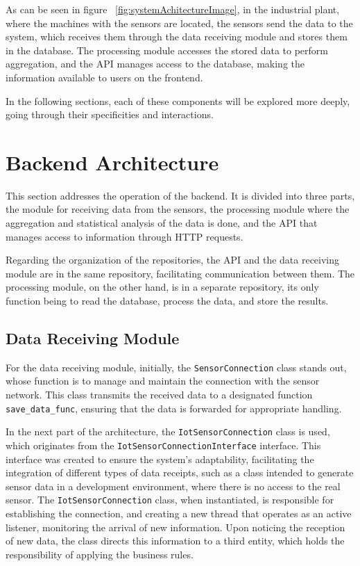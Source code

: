 As can be seen in figure ~\ref{fig:systemAchitectureImage}, in the industrial plant, where the machines with the sensors are located, the sensors send the data to the system, which receives them through the data receiving module and stores them in the database. The processing module accesses the stored data to perform aggregation, and the \gls{API} manages access to the database, making the information available to users on the frontend.

In the following sections, each of these components will be explored more deeply, going through their specificities and interactions.


\section[Backend Architecture]{Backend Architecture}
This section addresses the operation of the backend. It is divided into three parts, the module for receiving data from the sensors, the processing module where the aggregation and statistical analysis of the data is done, and the \gls{API} that manages access to information through \gls{HTTP} requests.

Regarding the organization of the repositories, the \gls{API} and the data receiving module are in the same repository, facilitating communication between them. The processing module, on the other hand, is in a separate repository, its only function being to read the database, process the data, and store the results.

\subsection{Data Receiving Module}\label{subsec:receiveDataModuleArch}
For the data receiving module, initially, the \texttt{SensorConnection} class stands out, whose function is to manage and maintain the connection with the sensor network. This class transmits the received data to a designated function \texttt{save\_data\_func}, ensuring that the data is forwarded for appropriate handling.

In the next part of the architecture, the \texttt{IotSensorConnection} class is used, which originates from the \texttt{IotSensorConnectionInterface} interface. This interface was created to ensure the system's adaptability, facilitating the integration of different types of data receipts, such as a class intended to generate sensor data in a development environment, where there is no access to the real sensor. The \texttt{IotSensorConnection} class, when instantiated, is responsible for establishing the connection, and creating a new thread that operates as an active listener, monitoring the arrival of new information. Upon noticing the reception of new data, the class directs this information to a third entity, which holds the responsibility of applying the business rules.

